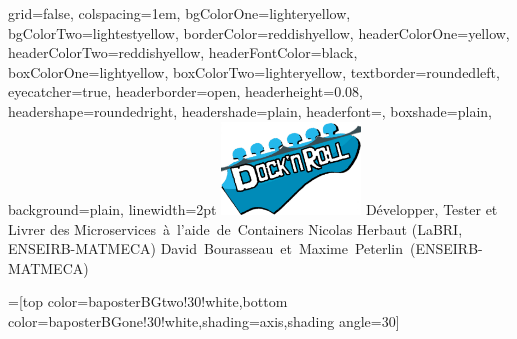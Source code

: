 \documentclass[portrait,final,a0paper]{baposter}
\begin{document}
\newlength{\leftimgwidth}
\begin{poster}%
  {
  grid=false,
  colspacing=1em,
  bgColorOne=lighteryellow,
  bgColorTwo=lightestyellow,
  borderColor=reddishyellow,
  headerColorOne=yellow,
  headerColorTwo=reddishyellow,
  headerFontColor=black,
  boxColorOne=lightyellow,
  boxColorTwo=lighteryellow,
  textborder=roundedleft,
  eyecatcher=true,
  headerborder=open,
  headerheight=0.08\textheight,
  headershape=roundedright,
  headershade=plain,
  headerfont=\Large\textsf, %
  boxshade=plain,
  background=plain,
  linewidth=2pt
  }
  {\includegraphics[width=10em]{docknroll}} %
  {\sf %
   Développer, Tester et Livrer des \mbox{Microservices à l'aide de Containers}}
  {\sf %
  \vspace{0.5em}
  Nicolas Herbaut (LaBRI, ENSEIRB-MATMECA) \mbox{David Bourasseau et Maxime Peterlin (ENSEIRB-MATMECA)}
  }
  {%
  }

  =[top color=baposterBGtwo!30!white,bottom color=baposterBGone!30!white,shading=axis,shading angle=30]

     \setlength{\leftimgwidth}{0.78em+8.0em}


\end{poster}
\end{document}
